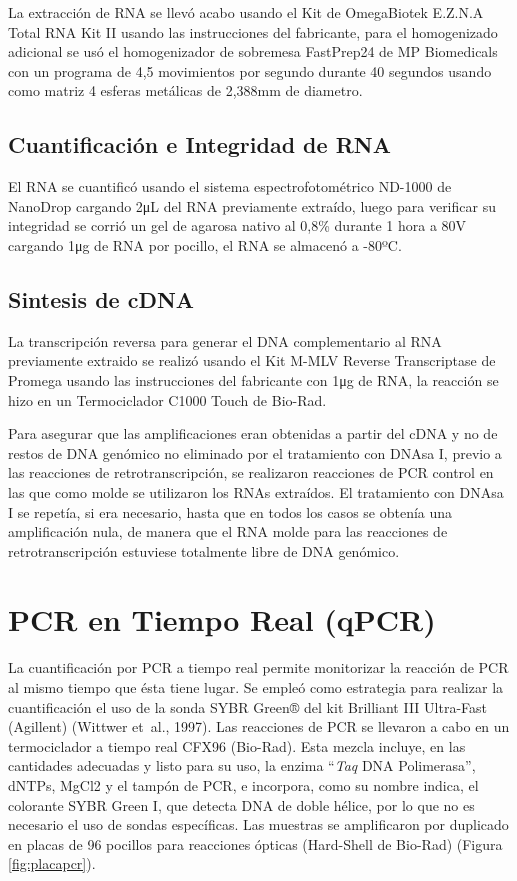 \documentclass[12pt,letterpaper,oneside]{scrbook}
\begin{document}
La extracción de RNA se llevó acabo usando el Kit de OmegaBiotek E.Z.N.A
Total RNA Kit II usando las instrucciones del fabricante, para el
homogenizado adicional se usó el homogenizador de sobremesa FastPrep24
de MP Biomedicals con un programa de 4,5 movimientos por segundo durante
40 segundos usando como matriz 4 esferas metálicas de 2,388mm de
diametro.

\subsection{Cuantificación e Integridad de RNA}

El RNA se cuantificó usando el sistema espectrofotométrico ND-1000 de
NanoDrop cargando 2\si{\micro\liter} del RNA previamente extraído, luego
para verificar su integridad se corrió un gel de agarosa nativo al 0,8\%
durante 1 hora a 80V cargando 1\si{\micro\gram} de RNA por pocillo, el
RNA se almacenó a -80ºC.

\subsection{Sintesis de cDNA}

La transcripción reversa para generar el DNA complementario al RNA
previamente extraido se realizó usando el Kit M-MLV Reverse
Transcriptase de Promega usando las instrucciones del fabricante con
1\si{\micro\gram} de RNA, la reacción se hizo en un Termociclador C1000
Touch de Bio-Rad.

Para asegurar que las amplificaciones eran obtenidas a partir del cDNA y
no de restos de DNA genómico no eliminado por el tratamiento con DNAsa
I, previo a las reacciones de retrotranscripción, se realizaron
reacciones de PCR control en las que como molde se utilizaron los RNAs
extraídos. El tratamiento con DNAsa I se repetía, si era necesario,
hasta que en todos los casos se obtenía una amplificación nula, de
manera que el RNA molde para las reacciones de retrotranscripción
estuviese totalmente libre de DNA genómico.

\section{PCR en Tiempo Real (qPCR)}

La cuantificación por PCR a tiempo real permite monitorizar la reacción
de PCR al mismo tiempo que ésta tiene lugar. Se empleó como estrategia
para realizar la cuantificación el uso de la sonda SYBR Green® del kit
Brilliant III Ultra-Fast (Agillent) (Wittwer et~al., 1997). Las
reacciones de PCR se llevaron a cabo en un termociclador a tiempo real
CFX96 (Bio-Rad). Esta mezcla incluye, en las cantidades adecuadas y
listo para su uso, la enzima ``\emph{Taq} DNA Polimerasa'', dNTPs, MgCl2
y el tampón de PCR, e incorpora, como su nombre indica, el colorante
SYBR Green I, que detecta DNA de doble hélice, por lo que no es
necesario el uso de sondas específicas. Las muestras se amplificaron por
duplicado en placas de 96 pocillos para reacciones ópticas (Hard-Shell
de Bio-Rad) (Figura \ref{fig:placapcr}).
\end{document}
